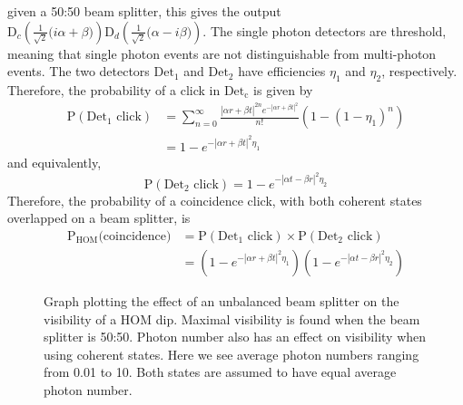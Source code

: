 given a 50:50 beam splitter, this gives the output $\text{D}_c(\frac{1}{\sqrt{2}}\big(i\alpha + \beta\big))\text{D}_d(\frac{1}{\sqrt{2}}\big(\alpha - i\beta\big))$. The single photon detectors are threshold, meaning that single photon events are not distinguishable from multi-photon events. The two detectors $\text{Det}_1$ and $\text{Det}_2$ have efficiencies $\eta_1$ and $\eta_2$, respectively. Therefore, the probability of a click in $\text{Det}_\text{c}$ is given by
\begin{align}
	\text{P}(\text{Det}_1 \text{ click}) &= \sum_{n=0}^\infty \frac{|\alpha r + \beta t|^{2n} e^{-|\alpha r + \beta t|^2}}{n!}(1-(1-\eta_1)^n)\\
	&= 1 - e^{-|\alpha r + \beta t|^2 \eta_1}
\end{align}
and equivalently,
\begin{equation}
	\text{P}(\text{Det}_2 \text{ click}) = 1 - e^{-|\alpha t - \beta r|^2 \eta_2}
\end{equation}
Therefore, the probability of a coincidence click, with both coherent states overlapped on a beam splitter, is
\begin{align}
	\text{P}_\text{HOM}\text{(coincidence)} &= \text{P}(\text{Det}_1 \text{ click}) \times \text{P}(\text{Det}_2 \text{ click})\\
	&= \left(1 - e^{-|\alpha r + \beta t|^2 \eta_1}\right)\left(1 - e^{-|\alpha t - \beta r|^2 \eta_2}\right)
\end{align}

\begin{figure}[tbp]
	\caption[Coherent state photon number visibility]{Graph plotting the effect of an unbalanced beam splitter on the visibility of a HOM dip. Maximal visibility is found when the beam splitter is 50:50. Photon number also has an effect on visibility when using coherent states. Here we see average photon numbers ranging from 0.01 to 10. Both states are assumed to have equal average photon number.}
	\label{fig:HOM_BS_Vis}
\end{figure}

